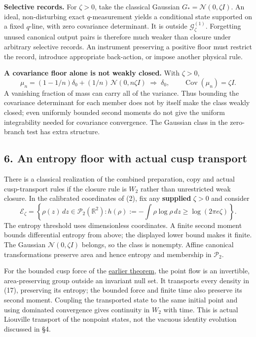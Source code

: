 \documentclass[11pt,a4paper]{article}
\begin{document}
\textbf{Selective records.} For \(\zeta>0\), take the classical Gaussian
\(G_*=\mathcal N(0,\zeta I)\). An ideal, non-disturbing exact
\(q\)-measurement yields a conditional state supported on a fixed
\(q\)-line, with zero covariance determinant. It is outside
\(\mathcal G_\zeta^{(1)}\). Forgetting unused canonical output pairs is
therefore much weaker than closure under arbitrary selective records. An
instrument preserving a positive floor must restrict the record,
introduce appropriate back-action, or impose another physical rule.

\textbf{A covariance floor alone is not weakly closed.} With
\(\zeta>0\), \[
 \mu_n=(1-1/n)\delta_0+(1/n)\,\mathcal N(0,n\zeta I)
 \;\Longrightarrow\;\delta_0,\qquad
 \operatorname{Cov}(\mu_n)=\zeta I.\tag{16}
\] A vanishing fraction of mass can carry all of the variance. Thus
bounding the covariance determinant for each member does not by itself
make the class weakly closed; even uniformly bounded second moments do
not give the uniform integrability needed for covariance convergence.
The Gaussian class in the zero-branch test has extra structure.

\hypertarget{an-entropy-floor-with-actual-cusp-transport}{%
\subsection{6. An entropy floor with actual cusp
transport}\label{an-entropy-floor-with-actual-cusp-transport}}

There is a classical realization of the combined preparation, copy and
actual cusp-transport rules if the closure rule is \(W_2\) rather than
unrestricted weak closure. In the calibrated coordinates of (2), fix any
\textbf{supplied} \(\zeta>0\) and consider \[
 \mathcal E_\zeta
 =\left\{\rho(z)\,dz\in\mathcal P_2(\mathbb R^2):
 h(\rho):=-\int\rho\log\rho\,dz\ge\log(2\pi e\zeta)\right\}.\tag{17}
\] The entropy threshold uses dimensionless coordinates. A finite second
moment bounds differential entropy from above; the displayed lower bound
makes it finite. The Gaussian \(\mathcal N(0,\zeta I)\) belongs, so the
class is nonempty. Affine canonical transformations preserve area and
hence entropy and membership in \(\mathcal P_2\).

For the bounded cusp force of the
\href{newton-cusp-preparation-floor.md}{earlier theorem}, the point flow
is an invertible, area-preserving group outside an invariant null set.
It transports every density in (17), preserving its entropy; the bounded
force and finite time also preserve its second moment. Coupling the
transported state to the same initial point and using dominated
convergence gives continuity in \(W_2\) with time. This is actual
Liouville transport of the nonpoint states, not the vacuous identity
evolution discussed in §4.
\end{document}
